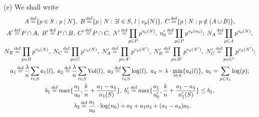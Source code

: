 \documentclass[10pt,a4paper]{amsart}
\DeclareMathOperator{\Vol}{\text{Vol}}
\DeclareMathOperator{\defeq}{\overset{\text{\tiny{def}}}{=}}
\begin{document}
\begin{definition}
(e) We shall write
\small\begin{gather*}
A\defeq \{p\in S : p\mid N\}, \;
B\defeq \{p\mid N: \exists l\in S,\, l\mid v_p(N) \}, \;
C\defeq \{p\mid N: p \notin (A\cup B)\}, \\
%
A' \defeq P \cap A, \;
B' \defeq P \cap B, \;
C' \defeq P \cap C, \;
N'\defeq \prod_{p\in P}p^{v_p(N)}, \;
n'_0 \defeq \prod_{p\in P}p^{v_p(n_0)}; \;
N_A \defeq \prod_{p\in A}p^{v_p(N)}, \\
N_B \defeq \prod_{p\in B}p^{v_p(N)},  \;
N_C \defeq \prod_{p\in C}p^{v_p(N)}, \;
N'_A \defeq \prod_{p\in A'}p^{v_p(N')}, \; 
N'_B \defeq \prod_{p\in B'}p^{v_p(N')},  \;
N'_C \defeq \prod_{p\in C'}p^{v_p(N')}; \\
%
a_1 \defeq \frac{\lambda}{n}\sum_{l\in S}a_1(l), \;
a_2 \defeq \frac{\lambda}{n}\sum_{l\in S}\Vol(l), \;
a_3 \defeq \sum_{l\in S}\log(l), \;
a_4 =\lambda\cdot \min_{l\in S}\{ a_4(l) \}, \;
a_5 = \sum_{p\in S_1} \log(p); \\
%
b_1 \defeq \max\{\frac{a_1}{u_0}, \frac{k}{n} + \frac{a_1-a_4}{n_1(S)} \}, \;
b'_1 \defeq \max\{\frac{a_1}{u'_0}, \frac{k}{n} + \frac{a_1-a_4}{n'_1(S)} \} \le b_1, \\
\quad  b_2 \defeq \frac{a_1}{u_0}\cdot \log(n_0) + a_2 + a_1a_3 + (a_1-a_4)a_5 .
\end{gather*}\normalsize

\end{definition}
\end{document}
